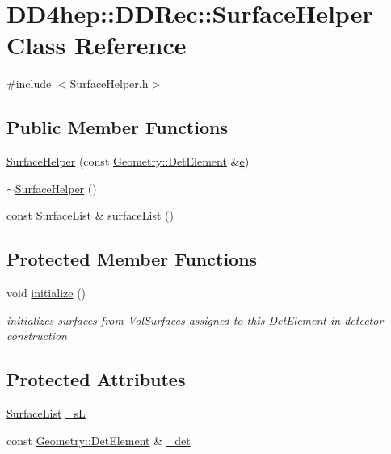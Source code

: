 \hypertarget{class_d_d4hep_1_1_d_d_rec_1_1_surface_helper}{}\section{D\+D4hep\+:\+:D\+D\+Rec\+:\+:Surface\+Helper Class Reference}
\label{class_d_d4hep_1_1_d_d_rec_1_1_surface_helper}


{\ttfamily \#include $<$Surface\+Helper.\+h$>$}

\subsection*{Public Member Functions}
\begin{DoxyCompactItemize}
\item 
\hyperlink{class_d_d4hep_1_1_d_d_rec_1_1_surface_helper_a76e5fe1cc5622045a000d2d94fdffc4d}{Surface\+Helper} (const \hyperlink{class_d_d4hep_1_1_geometry_1_1_det_element}{Geometry\+::\+Det\+Element} \&\hyperlink{_volumes_8cpp_a8a9a1f93e9b09afccaec215310e64142}{e})
\item 
\hyperlink{class_d_d4hep_1_1_d_d_rec_1_1_surface_helper_ae56de2da052504fa76ade5995a2d363d}{$\sim$\+Surface\+Helper} ()
\item 
const \hyperlink{class_d_d4hep_1_1_d_d_rec_1_1_surface_list}{Surface\+List} \& \hyperlink{class_d_d4hep_1_1_d_d_rec_1_1_surface_helper_afd1438e4c040058aac95a8af0167c91d}{surface\+List} ()
\end{DoxyCompactItemize}
\subsection*{Protected Member Functions}
\begin{DoxyCompactItemize}
\item 
void \hyperlink{class_d_d4hep_1_1_d_d_rec_1_1_surface_helper_ac394507ee2065b75f9540b388fd87170}{initialize} ()
\begin{DoxyCompactList}\small\item\em initializes surfaces from Vol\+Surfaces assigned to this Det\+Element in detector construction \end{DoxyCompactList}\end{DoxyCompactItemize}
\subsection*{Protected Attributes}
\begin{DoxyCompactItemize}
\item 
\hyperlink{class_d_d4hep_1_1_d_d_rec_1_1_surface_list}{Surface\+List} \hyperlink{class_d_d4hep_1_1_d_d_rec_1_1_surface_helper_a9284825af9dcbb9557f0cde59090dcd6}{\+\_\+sL}
\item 
const \hyperlink{class_d_d4hep_1_1_geometry_1_1_det_element}{Geometry\+::\+Det\+Element} \& \hyperlink{class_d_d4hep_1_1_d_d_rec_1_1_surface_helper_a879149ec569894c3080e2e0f3464dd8d}{\+\_\+det}
\end{DoxyCompactItemize}


